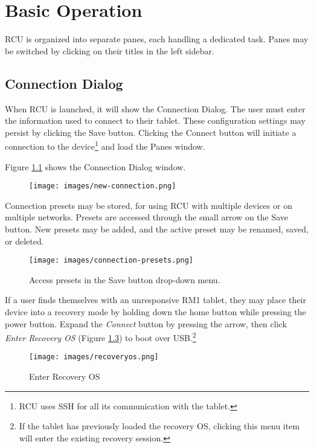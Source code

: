 \newpage
\chapter{Basic Operation}
RCU is organized into separate panes, each handling a dedicated task. Panes may be switched by clicking on their titles in the left sidebar.

\section{Connection Dialog}
\label{sec:connectiondialog}
When RCU is launched, it will show the Connection Dialog. The user must enter the information used to connect to their tablet. These configuration settings may persist by clicking the Save button. Clicking the Connect button will initiate a connection to the device\footnote{RCU uses SSH for all its communication with the tablet.} and load the Panes window.

Figure \ref{fig:connectiondialog} shows the Connection Dialog window.

\begin{figure}[h]
  \centering
  \texttt{[image: images/new-connection.png]}
  \caption{}
  \label{fig:connectiondialog}
\end{figure}

Connection presets may be stored, for using RCU with multiple devices or on multiple networks. Presets are accessed through the small arrow on the Save button. New presets may be added, and the active preset may be renamed, saved, or deleted.

\begin{figure}[h]
  \centering
  \texttt{[image: images/connection-presets.png]}
  \caption{Access presets in the Save button drop-down menu.}
  \label{fig:cxpresets}
\end{figure}



\newpage
If a user finds themselves with an unresponsive RM1 tablet, they may place their device into a recovery mode by holding down the home button while pressing the power button. Expand the \textit{Connect} button by pressing the arrow, then click \textit{Enter Recovery OS} (Figure \ref{fig:recoveryos}) to boot over USB.\footnote{If the tablet has previously loaded the recovery OS, clicking this menu item will enter the existing recovery session.}

\begin{figure}[h]
  \centering
  \texttt{[image: images/recoveryos.png]}
  \caption{Enter Recovery OS}
  \label{fig:recoveryos}
\end{figure}



